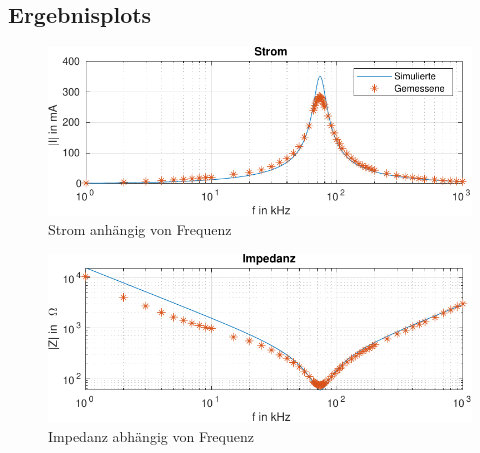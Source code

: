 \subsection{Ergebnisplots}
\label{subsec:4_Plots}
%
%
\begin{figure}[H]
    \centering
    \includegraphics{src/stromimpedanzlab3.pdf}
    \caption{Strom anhängig von Frequenz}
    \label{fig:strom}
\end{figure}
\begin{figure}[H]
    \centering
    \includegraphics{src/impedanzlab3.pdf}
    \caption{Impedanz abhängig von Frequenz}
    \label{fig:impedanz}
\end{figure}

%
%
%
\begin{flushright}
  \textit{\autorA}
\end{flushright}
%
%
%
%